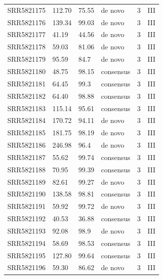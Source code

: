\begin{longtable}{@{}llllll@{}}
SRR5821175 & 112.70        & 75.55       & de novo      & 3        & III      \\
SRR5821176 & 139.34        & 99.03       & de novo      & 3        & III      \\
SRR5821177 & 41.19         & 44.56       & de novo      & 3        & III      \\
SRR5821178 & 59.03         & 81.06       & de novo      & 3        & III      \\
SRR5821179 & 95.59         & 84.7        & de novo      & 3        & III      \\
SRR5821180 & 48.75         & 98.15       & consensus    & 3        & III      \\
SRR5821181 & 64.45         & 99.3        & consensus    & 3        & III      \\
SRR5821182 & 64.40         & 98.88       & consensus    & 3        & III      \\
SRR5821183 & 115.14        & 95.61       & consensus    & 3        & III      \\
SRR5821184 & 170.72        & 94.11       & de novo      & 3        & III      \\
SRR5821185 & 181.75        & 98.19       & de novo      & 3        & III      \\
SRR5821186 & 246.98        & 96.4        & de novo      & 3        & III      \\
SRR5821187 & 55.62         & 99.74       & consensus    & 3        & III      \\
SRR5821188 & 70.95         & 99.39       & consensus    & 3        & III      \\
SRR5821189 & 82.61         & 99.27       & de novo      & 3        & III      \\
SRR5821190 & 138.58        & 98.81       & consensus    & 3        & III      \\
SRR5821191 & 59.92         & 99.72       & de novo      & 3        & III      \\
SRR5821192 & 40.53         & 36.88       & consensus    & 3        & III      \\
SRR5821193 & 92.08         & 98.9        & de novo      & 3        & III      \\
SRR5821194 & 58.69         & 98.53       & consensus    & 3        & III      \\
SRR5821195 & 127.80        & 99.64       & consensus    & 3        & III      \\
SRR5821196 & 59.30         & 86.62       & de novo      & 3        & III      \\

\end{longtable}
